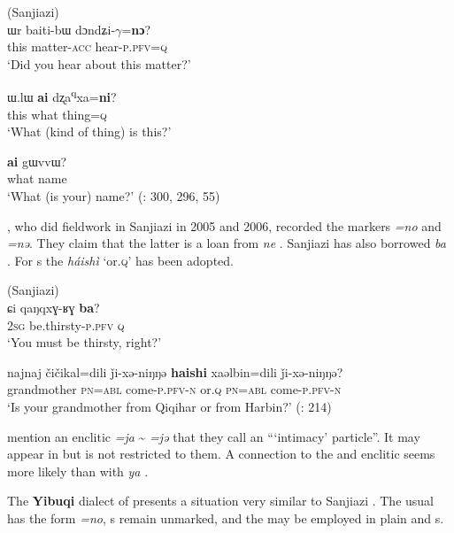 \ea%
    \label{ex:tungu:70}
     (Sanjiazi)\\
    \ea
    \gll ɯr  baiti-bɯ  dɔndʑi-$\gamma $=\textbf{{nɔ}}?\\
    this  matter-\textsc{acc}  hear-\textsc{p.pfv}=\textsc{q}\\
    \glt ‘Did you hear about this matter?’
    
    \ex
    \gll ɯ.l{ɯ} \textbf{{ai}} {dʐa\textsuperscript{q}}{xa=}\textbf{{ni}}?\\
    this  what  thing=\textsc{q}\\
    \glt ‘What (kind of thing) is this?’
    
    \ex
    \gll \textbf{{ai}} gɯvvɯ?\\
    what  name\\
    \glt ‘What (is your) name?’ (\citealt{Enhebatu1995}: 300, 296, 55)\z\z

\citet[45]{KimJuwon2008}, who did fieldwork in Sanjiazi in 2005 and 2006, recorded the markers \textit{=no} and \textit{=nə}. They claim that the latter is a loan from  \textit{ne} . Sanjiazi has also borrowed  \textit{ba} . For s the   \textit{háishì}  ‘or.\textsc{q}’ has been adopted.

\ea%
    \label{ex:tungu:71}
     (Sanjiazi)\\
    \ea
    \gll ɕi  qaŋqxɣ-ʁɣ \textbf{{ba}}?\\
    2\textsc{sg}  be.thirsty-\textsc{p.pfv}  \textsc{q}\\
    \glt ‘You must be thirsty, right?’ \citep[55]{Enhebatu1995}
    
    \ex
    \gll najnaj  čičikal=dili  ǰi-xə-niŋŋə \textbf{{haishi}} xaəlbin=dili  ǰi-xə-niŋŋə?\\
    grandmother  \textsc{pn}=\textsc{abl} come-\textsc{p.pfv}-\textsc{n}  or.\textsc{q}  \textsc{pn}=\textsc{abl}  come-\textsc{p.pfv}-\textsc{n}\\
    \glt ‘Is your grandmother from Qiqihar or from Harbin?’ (\citealt{KimJuwon2008}: 214)
    \z
    \z

\citet[46]{KimJuwon2008} mention an enclitic \textit{=ja} {\textasciitilde} \textit{=jə} that they call an “‘intimacy’ particle”. It may appear in  but is not restricted to them. A connection to the  and  enclitic seems more likely than with  \textit{ya} .

The \textbf{Yibuqi} dialect of  presents a situation very similar to Sanjiazi . The usual  has the form \textit{=no}, s remain unmarked, and the   may be employed in plain and s.

